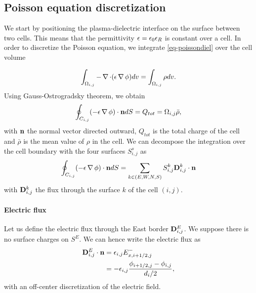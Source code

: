   \subsection{Poisson equation discretization}

    We start by positioning the plasma-dielectric interface on the surface between two cells.
    This means that the permittivity $\epsilon = \epsilon_0 \epsilon_{R}$ is  constant over a cell.
    In order to discretize the Poisson equation, we integrate \cref{eq-poissondiel} over the cell volume

    \begin{equation}
    \int_{\Omega_{i,j}} - \operatorname{{\mathbf \nabla}} \cdot (\epsilon \operatorname{{\mathbf \nabla}} \phi) dv= \int_{\Omega_{i,j}} \rho dv.
    \end{equation}
    Using Gauss-Ostrogradsky theorem, we obtain
    \begin{equation}
    \oint_{C_{i,j}} ( - \epsilon \operatorname{{\mathbf \nabla}} \phi) \cdot {\mathbf n} dS = Q_{tot} =  \Omega_{i,j} \bar{\rho},
    \end{equation}
    with ${\mathbf n}$ the normal vector directed outward, $Q_{tot}$ is the total charge of the cell and $\bar{\rho}$ is the mean value of $\rho$ in the cell.
    We can decompose the integration over the cell boundary with the four surfaces $S^s_{i,j}$ as
    \begin{equation}
      \label{eq-poissonsum}
    \oint_{C_{i,j}} (-\epsilon \operatorname{{\mathbf \nabla}} \phi) \cdot {\mathbf n} dS = \sum_{k\in(E,W,N,S)} S^k_{i,j} {\mathbf D}^k_{i,j} \cdot {\mathbf n}
    \end{equation}
    with ${\mathbf D}^k_{i,j}$ the flux through the surface $k$ of the cell $(i,j)$.


    \paragraph*{Electric flux \\}
    Let us define the electric flux through the East border  ${\mathbf D}^E_{i,j}$.
    We suppose there is no surface charges on $S^E$.
    We can hence write the electric flux as
    \begin{align} \label{eq-flux1}
      {\mathbf D}^E_{i,j} \cdot {\mathbf n} &= \epsilon_{i,j} E_{x, i+1/2,j}^-\\
                                      &= - \epsilon_{i,j} \frac{\phi_{i+1/2,j} - \phi_{i,j}}{d_i/2},
    \end{align}
    with an off-center discretization of the electric field.

